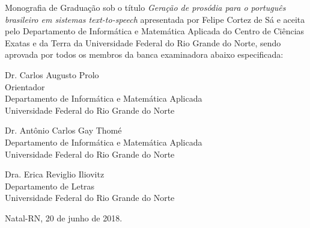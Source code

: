 \begin{folhadeaprovacao}
	\setlength{\ABNTsignthickness}{0.4pt}
	\setlength{\ABNTsignwidth}{10cm}
	
	\noindent 
	Monografia de Graduação sob o título \textit{Geração de prosódia para o português brasileiro em sistemas text-to-speech} apresentada por 
	Felipe Cortez de Sá e aceita pelo Departamento de Informática e Matemática Aplicada do
	Centro de Ciências Exatas e da Terra da Universidade Federal do Rio Grande do Norte,
	sendo aprovada por todos os membros da banca examinadora abaixo especificada:
		
	\assinatura
	{
		Dr. Carlos Augusto Prolo\\
		{\small Orientador} \\ 
		{\footnotesize
            Departamento de Informática e Matemática Aplicada\\
		  	Universidade Federal do Rio Grande do Norte
		}
	}
	
		
	\assinatura
	{
        Dr. Antônio Carlos Gay Thomé\\ 
		{\footnotesize
            Departamento de Informática e Matemática Aplicada\\
		  	Universidade Federal do Rio Grande do Norte
		}
	}
		
	\assinatura
	{
		Dra. Erica Reviglio Iliovitz \\ 
		{\footnotesize
            Departamento de Letras\\
		  	Universidade Federal do Rio Grande do Norte
		}
	}
		
	\vfill
	
	\begin{center}
		Natal-RN, 20 de junho de 2018.
	\end{center}
\end{folhadeaprovacao}
